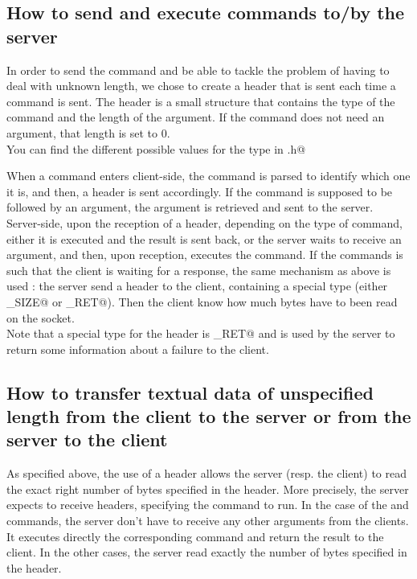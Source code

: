 \documentclass{article}
\begin{document}
\subsection{How to send and execute commands to/by the server}
In order to send the command and be able to tackle the problem of having to deal with unknown length, we chose to create a header that is sent each time a command is sent.
The header is a small structure that contains the type of the command and the length of the argument. If the command does not need an argument, that length is set to $0$.\\

You can find the different possible values for the type in \verb@header.h@ 

When a command enters client-side, the command is parsed to identify which one it is, and then, a header is sent accordingly. If the command is supposed to be followed by an argument, the argument is retrieved and sent to the server.\\

Server-side, upon the reception of a header, depending on the type of command, either it is executed and the result is sent back, or the server waits to receive an argument, and then, upon reception, executes the command. If the commands is such that the client is waiting for a response, the same mechanism as above is used : the server send a header to the client, containing a special type (either \verb@GET_SIZE@ or \verb@ERRNO_RET@). Then the client know how much bytes have to been read on the socket.\\

Note that a special type for the header is \verb@ERRNO_RET@ and is used by the server to return some information about a failure to the client.

\subsection{How to transfer textual data of unspecified length from the client to the server or from the server to the client}

As specified above, the use of a header allows the server (resp. the client) to read the exact right number of bytes specified in the header. More precisely, the server expects to receive headers, specifying the command to run. In the case of the \verb@PWD@ and \verb@LS@ commands, the server don't have to receive any other arguments from the clients. It executes directly the corresponding command and return the result to the client. In the other cases, the server read exactly the number of bytes specified in the header.\\
\end{document}
